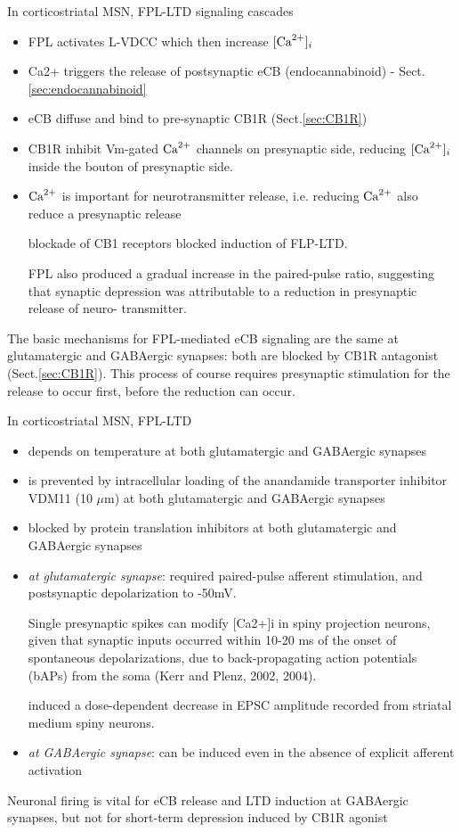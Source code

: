 In corticostriatal MSN, FPL-LTD signaling cascades
\begin{itemize}
  \item FPL activates L-VDCC which then increase $[{\text{Ca}^{2+}}]_i$
  
  \item Ca2+ triggers the release of postsynaptic eCB (endocannabinoid) -
  Sect.\ref{sec:endocannabinoid}
  
  \item eCB diffuse and bind to pre-synaptic CB1R (Sect.\ref{sec:CB1R})

  
  \item CB1R inhibit Vm-gated ${\text{Ca}^{2+}}$ channels on presynaptic side, reducing
  $[{\text{Ca}^{2+}}]_i$ inside the bouton of presynaptic side. 
  
  \item ${\text{Ca}^{2+}}$ is important for neurotransmitter release, i.e. reducing
  ${\text{Ca}^{2+}}$ also reduce a presynaptic release

blockade of CB1 receptors blocked induction of FLP-LTD.
  
  FPL also produced a gradual increase in the paired-pulse ratio, suggesting
that synaptic depression was attributable to a reduction in presynaptic release
of neuro- transmitter.

\end{itemize}
The basic mechanisms for FPL-mediated eCB signaling are the same at
glutamatergic and GABAergic synapses: both are blocked by CB1R antagonist
(Sect.\ref{sec:CB1R}). This process of course requires presynaptic stimulation
for the release to occur first, before the reduction can occur.

In corticostriatal MSN, FPL-LTD 
\begin{itemize}
  \item depends on temperature at both glutamatergic and GABAergic synapses
  \item is prevented by intracellular loading of the anandamide transporter
  inhibitor VDM11 (10 $\mu$m) at both glutamatergic and GABAergic synapses

  \item blocked by protein translation inhibitors  at both glutamatergic and
  GABAergic synapses
  
 
  \item {\it at glutamatergic synapse}: required paired-pulse afferent
  stimulation, and postsynaptic depolarization to -50mV.
  
  Single presynaptic spikes can modify [Ca2+]i in spiny projection neurons,
  given that  synaptic inputs occurred within 10-20 ms of the onset of
  spontaneous depolarizations, due to back-propagating action potentials (bAPs)
  from the soma (Kerr and Plenz, 2002, 2004).
  
  induced a dose-dependent decrease in EPSC amplitude recorded from striatal
  medium spiny neurons.
  
  \item {\it at GABAergic synapse}: can be induced even in the absence of
  explicit afferent activation
\end{itemize}
Neuronal firing is vital for eCB release and LTD induction at GABAergic
synapses, but not for short-term depression induced by CB1R agonist
\citep{adermark2009}


